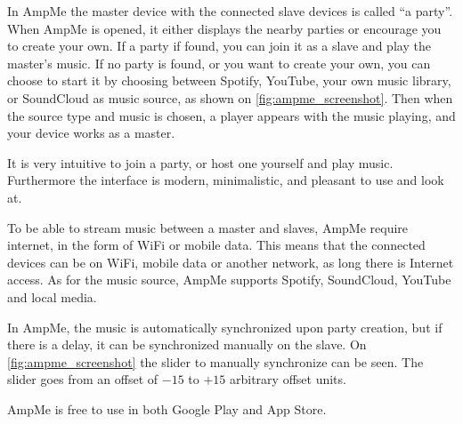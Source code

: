 In AmpMe the master device with the connected slave devices is called ``a party''.
When AmpMe is opened, it either displays the nearby parties or encourage you to create your own. 
If a party if found, you can join it as a slave and play the master's music.
If no party is found, or you want to create your own, you can choose to start it by choosing between Spotify, 
YouTube, your own music library, or SoundCloud as music source, as shown on \cref{fig:ampme_screenshot}. 
Then when the source type and music is chosen, a player appears with the music playing,
and your device works as a master.

It is very intuitive to join a party, or host one yourself and play music.
Furthermore the interface is modern, minimalistic, and pleasant to use and look at. 

To be able to stream music between a master and slaves, AmpMe require internet, in the form of WiFi or mobile data.
This means that the connected devices can be on WiFi, mobile data or another network, as long there is Internet access. 
As for the music source, AmpMe supports Spotify, SoundCloud, YouTube and local media.

In AmpMe, the music is automatically synchronized upon party creation,
but if there is a delay, it can be synchronized manually on the slave.
On \cref{fig:ampme_screenshot} the slider to manually synchronize can be seen.
The slider goes from an offset of $-15$ to $+15$ arbitrary offset units.

AmpMe is free to use in both Google Play and App Store.\cite{amp_faq}\cite{amp_play}\cite{amp_itunes}


